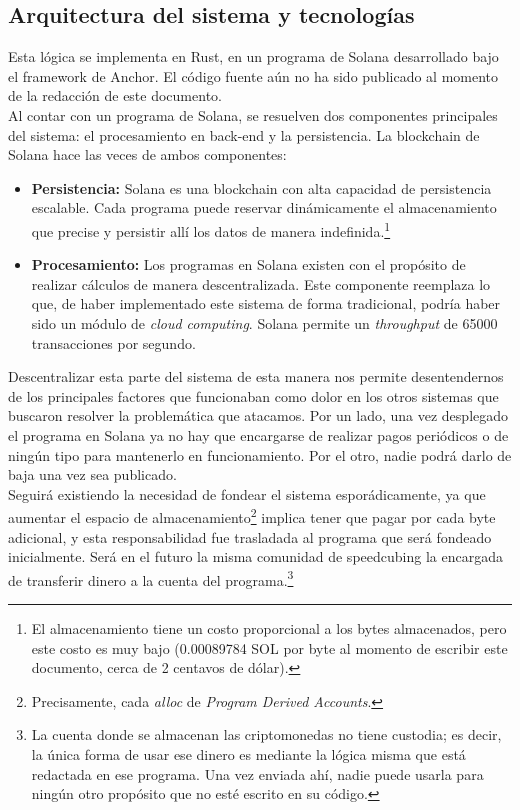 \begin{multicols}{2}
\section{Arquitectura del sistema y tecnologías}

Esta lógica se implementa en Rust\cite{rust}, en un programa de Solana\cite{solana} desarrollado bajo el framework de Anchor\cite{anchor}. El código fuente aún no ha sido publicado al momento de la redacción de este documento.\\

Al contar con un programa de Solana, se resuelven dos componentes principales del sistema: el procesamiento en back-end y la persistencia. La blockchain de Solana hace las veces de ambos componentes:

\begin{itemize}
    \item \textbf{Persistencia:} Solana es una blockchain con alta capacidad de persistencia escalable. Cada programa puede reservar dinámicamente el almacenamiento que precise y persistir allí los datos de manera indefinida.\footnote{El almacenamiento tiene un costo proporcional a los bytes almacenados, pero este costo es muy bajo (0.00089784 SOL por byte al momento de escribir este documento, cerca de 2 centavos de dólar).}
    \item \textbf{Procesamiento:} Los programas en Solana existen con el propósito de realizar cálculos de manera descentralizada. Este componente reemplaza lo que, de haber implementado este sistema de forma tradicional, podría haber sido un módulo de \textit{cloud computing}. Solana permite un \textit{throughput} de 65000 transacciones por segundo\cite{solana-throughput}.
\end{itemize}

Descentralizar esta parte del sistema de esta manera nos permite desentendernos de los principales factores que funcionaban como dolor en los otros sistemas que buscaron resolver la problemática que atacamos. Por un lado, una vez desplegado el programa en Solana ya no hay que encargarse de realizar pagos periódicos o de ningún tipo para mantenerlo en funcionamiento. Por el otro, nadie podrá darlo de baja una vez sea publicado.\\

Seguirá existiendo la necesidad de fondear el sistema esporádicamente, ya que aumentar el espacio de almacenamiento\footnote{Precisamente, cada \textit{alloc} de \textit{Program Derived Accounts}.} implica tener que pagar por cada byte adicional, y esta responsabilidad fue trasladada al programa que será fondeado inicialmente. Será en el futuro la misma comunidad de speedcubing la encargada de transferir dinero a la cuenta del programa.\footnote{La cuenta donde se almacenan las criptomonedas no tiene custodia; es decir, la única forma de usar ese dinero es mediante la lógica misma que está redactada en ese programa. Una vez enviada ahí, nadie puede usarla para ningún otro propósito que no esté escrito en su código.}\\


\end{multicols}
